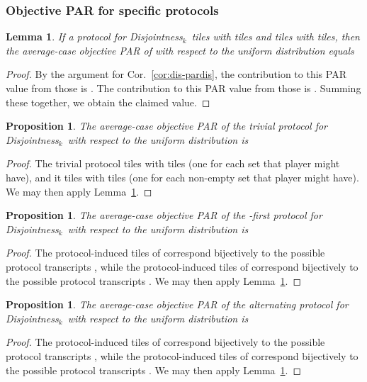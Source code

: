 \documentclass{article}
\theoremstyle{theorem}
\newtheorem{lemma}[theorem]{Lemma}
\newtheorem{prop}[theorem]{Proposition}
\theoremstyle{definition}
\theoremstyle{remark}
\newcommand{\disjoint}{{\sc Dis\-joint\-ness}\ensuremath{_k}}
\begin{document}
\subsubsection{Objective PAR for specific protocols}

\begin{lemma}\label{lem:dis-par}
If a protocol  for \disjoint\ tiles  with  tiles and tiles  with  tiles, then the average-case objective PAR of  with respect to the uniform distribution equals

\end{lemma}
\begin{proof}
By the argument for Cor.~\ref{cor:dis-pardis}, the contribution to this PAR value from those  is .  The contribution to this PAR value from those  is .  Summing these together, we obtain the claimed value.
\end{proof}

\begin{prop}
The average-case objective PAR of the trivial protocol for \disjoint\ with respect to the uniform distribution is

\end{prop}
\begin{proof}
The trivial protocol tiles  with  tiles (one for each set  that player  might have), and it tiles  with  tiles (one for each non-empty set  that player  might have).  We may then apply Lemma~\ref{lem:dis-par}.
\end{proof}

\begin{prop}
The average-case objective PAR of the -first protocol for \disjoint\ with respect to the uniform distribution is

\end{prop}
\begin{proof}
The protocol-induced tiles of  correspond bijectively to the  possible protocol transcripts , while the protocol-induced tiles of  correspond bijectively to the  possible protocol transcripts .  We may then apply Lemma~\ref{lem:dis-par}.
\end{proof}

\begin{prop}
The average-case objective PAR of the alternating protocol for \disjoint\ with respect to the uniform distribution is

\end{prop}
\begin{proof}
The protocol-induced tiles of  correspond bijectively to the  possible protocol transcripts , while the protocol-induced tiles of  correspond bijectively to the  possible protocol transcripts .  We may then apply Lemma~\ref{lem:dis-par}.
\end{proof}
\end{document}
